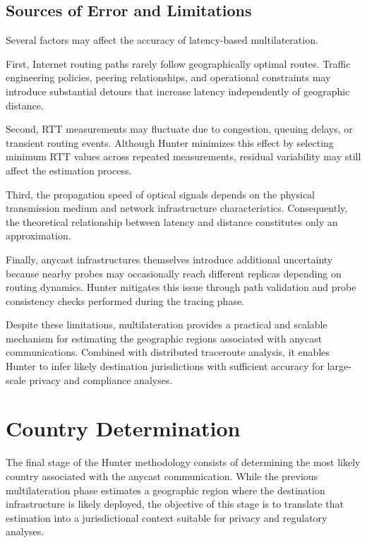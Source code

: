 \subsection{Sources of Error and Limitations}

Several factors may affect the accuracy of latency-based multilateration.

First, Internet routing paths rarely follow geographically optimal routes. Traffic engineering policies, peering relationships, and operational constraints may introduce substantial detours that increase latency independently of geographic distance.

Second, RTT measurements may fluctuate due to congestion, queuing delays, or transient routing events. Although Hunter minimizes this effect by selecting minimum RTT values across repeated measurements, residual variability may still affect the estimation process.

Third, the propagation speed of optical signals depends on the physical transmission medium and network infrastructure characteristics. Consequently, the theoretical relationship between latency and distance constitutes only an approximation.

Finally, anycast infrastructures themselves introduce additional uncertainty because nearby probes may occasionally reach different replicas depending on routing dynamics. Hunter mitigates this issue through path validation and probe consistency checks performed during the tracing phase.

Despite these limitations, multilateration provides a practical and scalable mechanism for estimating the geographic regions associated with anycast communications. Combined with distributed traceroute analysis, it enables Hunter to infer likely destination jurisdictions with sufficient accuracy for large-scale privacy and compliance analyses.

\section{Country Determination}
\label{sc:hunter_country_determination}

The final stage of the Hunter methodology consists of determining the most likely country associated with the anycast communication. While the previous multilateration phase estimates a geographic region where the destination infrastructure is likely deployed, the objective of this stage is to translate that estimation into a jurisdictional context suitable for privacy and regulatory analyses.

